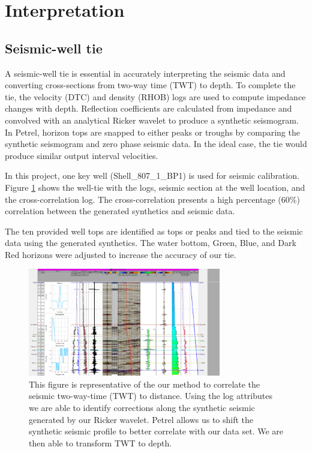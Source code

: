 \documentclass[fleqn]{article}
\begin{document}
\section{Interpretation}
\subsection{Seismic-well tie}

A seismic-well tie is essential in accurately interpreting the seismic data and converting  cross-sections from two-way time (TWT) to depth. To complete the tie, the velocity (DTC) and density (RHOB) logs are used to compute impedance changes with depth. Reflection coefficients are calculated from impedance and convolved with an analytical Ricker wavelet to produce a synthetic seismogram. In Petrel, horizon tops are snapped to either peaks or troughs by comparing the synthetic seismogram and zero phase seismic data. In the ideal case, the tie would produce similar output interval velocities. 

In this project, one key well (Shell\_807\_1\_BP1) is used for seismic calibration. Figure \ref{fig:WellTie} shows the well-tie with the logs, seismic section at the well location, and the cross-correlation log. The cross-correlation presents a high percentage (60\%) correlation between the generated synthetics and seismic data. 

The ten provided well tops are identified as tops or peaks and tied to the seismic data using the generated synthetics. The water bottom, Green, Blue, and Dark Red horizons were adjusted to increase the accuracy of our tie.

\begin{figure}[H]
    \centering
    \includegraphics[width=0.75\textwidth]{Images/WellTie Extended.png}
    \caption{This figure is representative of the our method to correlate the seismic two-way-time (TWT) to distance. Using the log attributes we are able to identify corrections along the synthetic seismic generated by our Ricker wavelet. Petrel allows us to shift the synthetic seismic profile to better correlate with our data set. We are then able to transform TWT to depth.}
    \label{fig:WellTie}
\end{figure}
\end{document}
